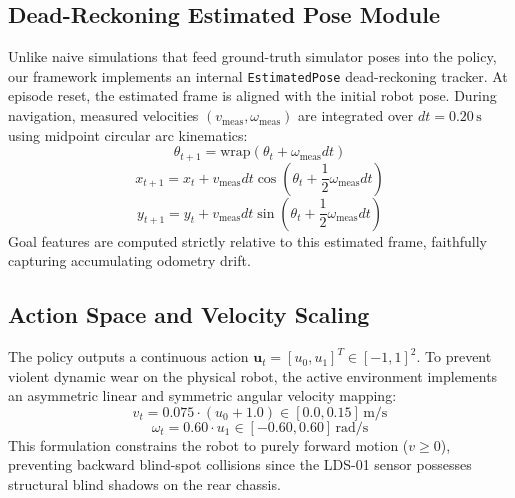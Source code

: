 \documentclass[conference]{IEEEtran}
\begin{document}
\subsection{Dead-Reckoning Estimated Pose Module}
Unlike naive simulations that feed ground-truth simulator poses into the policy, our framework implements an internal \texttt{EstimatedPose} dead-reckoning tracker. At episode reset, the estimated frame is aligned with the initial robot pose. During navigation, measured velocities $(v_{\text{meas}}, \omega_{\text{meas}})$ are integrated over $dt = 0.20\,\text{s}$ using midpoint circular arc kinematics:
\begin{equation}
\theta_{t+1} = \text{wrap}(\theta_t + \omega_{\text{meas}} dt)
\end{equation}
\begin{equation}
x_{t+1} = x_t + v_{\text{meas}} dt \cos\left(\theta_t + \frac{1}{2}\omega_{\text{meas}} dt\right)
\end{equation}
\begin{equation}
y_{t+1} = y_t + v_{\text{meas}} dt \sin\left(\theta_t + \frac{1}{2}\omega_{\text{meas}} dt\right)
\end{equation}
Goal features are computed strictly relative to this estimated frame, faithfully capturing accumulating odometry drift.

\subsection{Action Space and Velocity Scaling}
The policy outputs a continuous action $\mathbf{u}_t = [u_0, u_1]^T \in [-1, 1]^2$. To prevent violent dynamic wear on the physical robot, the active environment implements an asymmetric linear and symmetric angular velocity mapping:
\begin{equation}
v_t = 0.075 \cdot (u_0 + 1.0) \in [0.0, 0.15]\,\text{m/s}
\end{equation}
\begin{equation}
\omega_t = 0.60 \cdot u_1 \in [-0.60, 0.60]\,\text{rad/s}
\end{equation}
This formulation constrains the robot to purely forward motion ($v \ge 0$), preventing backward blind-spot collisions since the LDS-01 sensor possesses structural blind shadows on the rear chassis.
\end{document}

